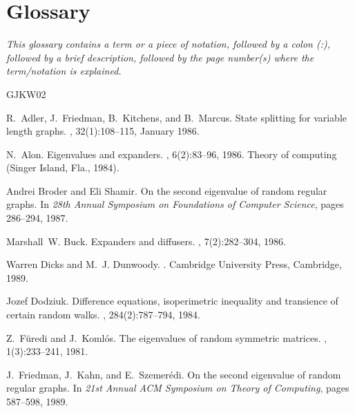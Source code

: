 \documentclass[12pt]{article}
\begin{document}
\section*{Glossary}
{\em This glossary contains a term or a piece of notation, followed
by a colon (:), followed by a brief description, followed by the page
number(s) where the term/notation is explained.}
\medskip
\renewenvironment{theindex}{\begin{description}}{\end{description}}

%

\begin{thebibliography}{GJKW02}

R.~Adler, J.~Friedman, B.~Kitchens, and B.~Marcus.
\newblock State splitting for variable length graphs.
, 32(1):108--115,
  January 1986.

N.~Alon.
\newblock Eigenvalues and expanders.
, 6(2):83--96, 1986.
\newblock Theory of computing (Singer Island, Fla., 1984).

Andrei Broder and Eli Shamir.
\newblock On the second eigenvalue of random regular graphs.
\newblock In {\em 28th Annual Symposium on Foundations of Computer Science},
  pages 286--294, 1987.

Marshall~W. Buck.
\newblock Expanders and diffusers.
, 7(2):282--304, 1986.

Warren Dicks and M.~J. Dunwoody.
.
\newblock Cambridge University Press, Cambridge, 1989.

Jozef Dodziuk.
\newblock Difference equations, isoperimetric inequality and transience of
  certain random walks.
, 284(2):787--794, 1984.

Z.~{F\"uredi} and J.~{Koml\'os}.
\newblock The eigenvalues of random symmetric matrices.
, 1(3):233--241, 1981.

J.~Friedman, J.~Kahn, and E.~Szemer{\'e}di.
\newblock On the second eigenvalue of random regular graphs.
\newblock In {\em 21st Annual ACM Symposium on Theory of Computing}, pages
  587--598, 1989.


\end{thebibliography}
\end{document}
